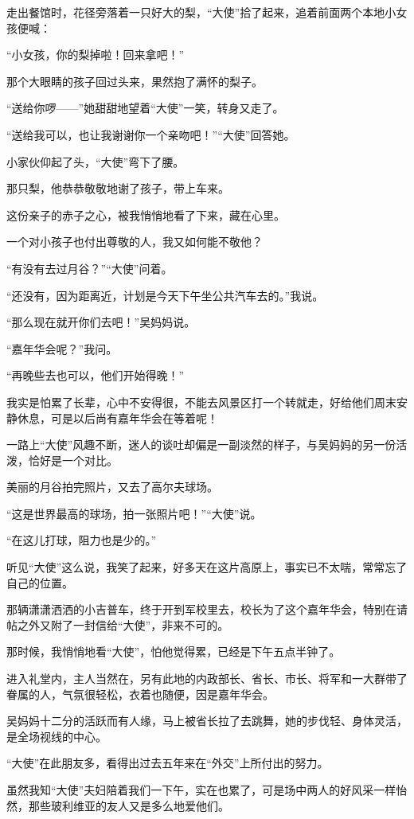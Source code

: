 \par 走出餐馆时，花径旁落着一只好大的梨，“大使”拾了起来，追着前面两个本地小女孩便喊：
\par “小女孩，你的梨掉啦！回来拿吧！”
\par 那个大眼睛的孩子回过头来，果然抱了满怀的梨子。
\par “送给你啰——”她甜甜地望着“大使”一笑，转身又走了。
\par “送给我可以，也让我谢谢你一个亲吻吧！”“大使”回答她。
\par 小家伙仰起了头，“大使”弯下了腰。
\par 那只梨，他恭恭敬敬地谢了孩子，带上车来。
\par 这份亲子的赤子之心，被我悄悄地看了下来，藏在心里。
\par 一个对小孩子也付出尊敬的人，我又如何能不敬他？
\par “有没有去过月谷？”“大使”问着。
\par “还没有，因为距离近，计划是今天下午坐公共汽车去的。”我说。
\par “那么现在就开你们去吧！”吴妈妈说。
\par “嘉年华会呢？”我问。
\par “再晚些去也可以，他们开始得晚！”
\par 我实是怕累了长辈，心中不安得很，不能去风景区打一个转就走，好给他们周末安静休息，可是以后尚有嘉年华会在等着呢！
\par 一路上“大使”风趣不断，迷人的谈吐却偏是一副淡然的样子，与吴妈妈的另一份活泼，恰好是一个对比。
\par 美丽的月谷拍完照片，又去了高尔夫球场。
\par “这是世界最高的球场，拍一张照片吧！”“大使”说。
\par “在这儿打球，阻力也是少的。”
\par 听见“大使”这么说，我笑了起来，好多天在这片高原上，事实已不太喘，常常忘了自己的位置。
\par 那辆潇潇洒洒的小吉普车，终于开到军校里去，校长为了这个嘉年华会，特别在请帖之外又附了一封信给“大使”，非来不可的。
\par 那时候，我悄悄地看“大使”，怕他觉得累，已经是下午五点半钟了。
\par 进入礼堂内，主人当然在，另有此地的内政部长、省长、市长、将军和一大群带了眷属的人，气氛很轻松，衣着也随便，因是嘉年华会。
\par 吴妈妈十二分的活跃而有人缘，马上被省长拉了去跳舞，她的步伐轻、身体灵活，是全场视线的中心。
\par “大使”在此朋友多，看得出过去五年来在“外交”上所付出的努力。
\par 虽然我知“大使”夫妇陪着我们一下午，实在也累了，可是场中两人的好风采一样怡然，那些玻利维亚的友人又是多么地爱他们。
